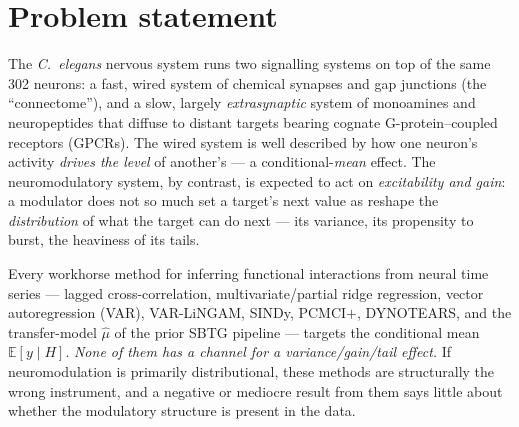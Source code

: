 \documentclass[11pt]{article}
\newcommand{\Hcal}{H}
\newcommand{\E}{\mathbb{E}}
\begin{document}
\begin{abstract}
consistent but not individually significant as neurons are traded for worms across 6--28 animals and
two imputation schemes); and, decisively, it is \textbf{not an estimator artifact} --- a
circular-shift surrogate that destroys cross-neuron coupling collapses the contrast to zero, with the
observed value in the tail ($p=0.008$). It is, however, \emph{single-instrument}: a cruder non-SID
variance estimator does not corroborate it. We therefore report it at exactly that altitude --- a
real, partial, surrogate-validated but as-yet single-instrument signal --- rather than over-claiming.
Along the way we retract an early ``tyramine'' over-claim that a trivial source-variance baseline
fully explained, and document the controls-first methodology that caught it (and that the surrogate
null extends).
\end{abstract}

\section{Problem statement}
\label{sec:problem}

The \textit{C.\ elegans} nervous system runs two signalling systems on top of the same 302 neurons:
a fast, wired system of chemical synapses and gap junctions (the ``connectome''), and a slow,
largely \emph{extrasynaptic} system of monoamines and neuropeptides that diffuse to distant
targets bearing cognate G-protein--coupled receptors (GPCRs). The wired system is well described by
how one neuron's activity \emph{drives the level} of another's --- a conditional-\emph{mean} effect.
The neuromodulatory system, by contrast, is expected to act on \emph{excitability and gain}: a
modulator does not so much set a target's next value as reshape the \emph{distribution} of what the
target can do next --- its variance, its propensity to burst, the heaviness of its tails.

Every workhorse method for inferring functional interactions from neural time series --- lagged
cross-correlation, multivariate/partial ridge regression, vector autoregression (VAR), VAR-LiNGAM,
SINDy, PCMCI$+$, DYNOTEARS, and the transfer-model $\hat\mu$ of the prior SBTG pipeline --- targets
the conditional mean $\E[y\mid \Hcal]$. \emph{None of them has a channel for a variance/gain/tail
effect.} If neuromodulation is primarily distributional, these methods are structurally the wrong
instrument, and a negative or mediocre result from them says little about whether the modulatory
structure is present in the data.
\end{document}
